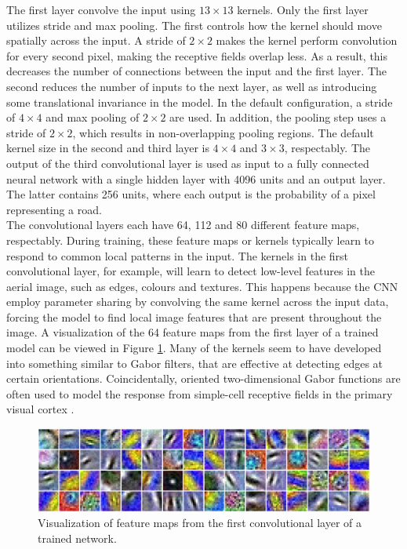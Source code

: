 The first layer convolve the input using $13 \times 13$ kernels. Only the first layer utilizes stride and max pooling. The first controls how the kernel should move spatially across the input. A stride of $2 \times 2$ makes the kernel perform convolution for every second pixel, making the receptive fields overlap less. As a result, this decreases the number of connections between the input and the first layer. The second reduces the number of inputs to the next layer, as well as introducing some translational invariance in the model. In the default configuration, a stride of $4 \times 4$ and max pooling of $2 \times 2$ are used. In addition, the pooling step uses a stride of $2 \times 2$, which results in non-overlapping pooling regions. The default kernel size in the second and third layer is $4 \times 4$ and $3 \times 3$, respectably. The output of the third convolutional layer is used as input to a fully connected neural network with a single hidden layer with 4096 units and an output layer. The latter contains 256 units, where each output is the probability of a pixel representing a road.\\


The convolutional layers each have 64, 112 and 80 different feature maps, respectably. During training, these feature maps or kernels typically learn to respond to common local patterns in the input. The kernels in the first convolutional layer, for example, will learn to detect low-level features in the aerial image, such as edges, colours and textures. This happens because the \ac{CNN} employ parameter sharing by convolving the same kernel across the input data, forcing the model to find local image features that are present throughout the image. A visualization of the 64 feature maps from the first layer of a trained model can be viewed in Figure \ref{fig:convoluional_first_layer_visualization}. Many of the kernels seem to have developed into something similar to Gabor filters, that are effective at detecting edges at certain orientations. Coincidentally, oriented two-dimensional Gabor functions are often used to model the response from simple-cell receptive fields in the primary visual cortex \citep{Ringach_gabor_spatial}. \\


\begin{figure}
\begin{center}
\includegraphics[width=1\columnwidth]{figs/network/Filter_unblurred.png}
\caption[Visualization of filter map]{Visualization of feature maps from the first convolutional layer of a trained network.}
\label{fig:convoluional_first_layer_visualization}
\end{center}
\end{figure}

